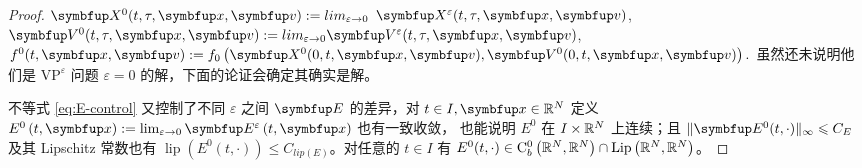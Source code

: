 \begin{proof}
$\vect{X}^{0}(t, \tau, \vx, \vv):= lim _{\varepsilon \rightarrow 0}$ $\vect{X}^{\varepsilon}(t, \tau, \vx, \vv)$, $\vect{V}^{0}(t, \tau, \vx, \vv):= lim _{\varepsilon \rightarrow 0} \vect{V}^{\varepsilon}(t, \tau, \vx, \vv)$, $f^{0}(t, \vx, \vv):=f_{0}\left(\vect{X}^{0}(0, t, \vx, \vv), \vect{V}^{0}(0, t, \vx, \vv)\right) .$ 虽然还未说明他们是 $\text{VP}^\varepsilon$ 问题 $\varepsilon=0$ 的解，下面的论证会确定其确实是解。







不等式 \ref{eq:E-control} 又控制了不同 $\varepsilon$ 之间 $\vE$ 的差异，对 $t \in I, \vx \in \bbR^{N}$ 定义 $E^{0}\left(t, \vx\right):=\lim _{\varepsilon \rightarrow 0} \vE^{\varepsilon}\left(t, \vx\right) $ 也有一致收敛，
也能说明 $E^{0}$ 在 $I \times {\mathbb{R}}^{N}$ 上连续；且 $\|\vE^{0}(t, \cdot)\|_{\infty} \leqslant C_{E}$ 及其 Lipschitz 常数也有 $\operatorname{lip}\left(E^{0}(t, \cdot)\right) \leqslant C_{lip(E)}$。对任意的 $t \in I$ 有 $E^{0}(t, \cdot) \in \mathrm{C}_{b}^{0}\left({\mathbb{R}}^{N}, {\mathbb{R}}^{N}\right) \cap \operatorname{Lip}\left({\mathbb{R}}^{N}, {\mathbb{R}}^{N}\right)$。


\end{proof}
